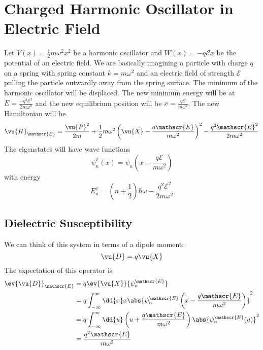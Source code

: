 \documentclass[a4paper,twoside,master.tex]{subfiles}
\begin{document}

\section{Charged Harmonic Oscillator in Electric Field}
\label{sec:charged_harmonic_oscillator_in_electric_field}

Let $ V(x) = \frac{1}{2} m \omega^2 x^2 $ be a harmonic oscillator and $ W(x) = - q \mathscr{E} x $ be the potential of an electric field. We are basically imagining a particle with charge $ q $ on a spring with spring constant $ k = m \omega^2 $ and an electric field of strength $ \mathscr{E} $ pulling the particle outwardly away from the spring surface. The minimum of the harmonic oscillator will be displaced. The new minimum energy will be at $ E = \frac{-q^2 \mathscr{E}^2}{2 m \omega^2} $ and the new equilibrium position will be $ x = \frac{q\mathscr{E}}{m \omega^2} $. The new Hamiltonian will be
\begin{equation}
    \vu{H}_{\mathscr{E}} = \frac{\vu{P}^2}{2m} + \frac{1}{2} m \omega^2 \left( \vu{X} - \frac{q\mathscr{E}}{m \omega^2} \right)^2 - \frac{q^2 \mathscr{E}^2}{2 m \omega^2}
\end{equation}
The eigenstates will have wave functions
\begin{equation}
    \psi_{n}^{\mathscr{E}}(x) = \psi_n\left( x - \frac{q\mathscr{E}}{m \omega^2} \right)
\end{equation}
with energy
\begin{equation}
    E_n^{\mathscr{E}} = \left( n + \frac{1}{2} \right) \hbar \omega - \frac{q^2 \mathscr{E}^2}{2m \omega^2}
\end{equation}

\subsection{Dielectric Susceptibility}
\label{sub:dielectric_susceptibility}
We can think of this system in terms of a dipole moment:
\begin{equation}
    \vu{D} = q \vu{X}
\end{equation}
The expectation of this operator is
\begin{align}
    \ev{\vu{D}}_{\mathscr{E}} &= q \ev{ \vu{X}}{\psi_n^{\mathscr{E}}} \\
    &= q \int_{- \infty}^{\infty} \dd{x} x \abs{\psi_n^{\mathscr{E}}\left( x - \frac{q\mathscr{E}}{m \omega^2} \right)}^2 \\
    &= q \int_{- \infty}^{\infty} \dd{u} \left( u + \frac{q\mathscr{E}}{m \omega^2}\right) \abs{\psi_n^{\mathscr{E}}(u)}^2 \\
    &= \frac{q^2 \mathscr{E}}{m \omega^2}
\end{align}
\end{document}
